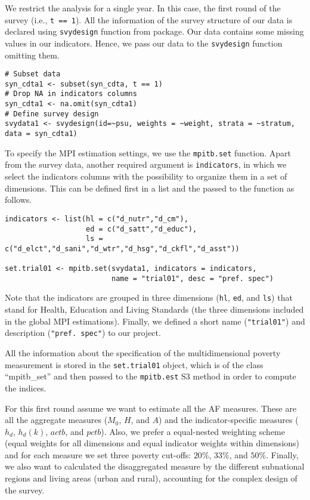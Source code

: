 We restrict the analysis for a single year. In this case, the first
round of the survey (i.e., \texttt{t\ ==\ 1}). All the information of the survey
structure of our data is declared using \texttt{svydesign} function from
 package. Our data contains some missing values in our
indicators. Hence, we pass our data to the \texttt{svydesign} function omitting
them.

\begin{verbatim}
# Subset data
syn_cdta1 <- subset(syn_cdta, t == 1)
# Drop NA in indicators columns
syn_cdta1 <- na.omit(syn_cdta1)
# Define survey design
svydata1 <- svydesign(id=~psu, weights = ~weight, strata = ~stratum, data = syn_cdta1)
\end{verbatim}

To specify the MPI estimation settings, we use the \texttt{mpitb.set} function.
Apart from the survey data, another required argument is \texttt{indicators},
in which we select the indicators columns with the possibility to organize them in a set of
dimensions. This can be defined first in a list and the passed to the function as
follows.

\begin{verbatim}
indicators <- list(hl = c("d_nutr","d_cm"),
                   ed = c("d_satt","d_educ"),
                   ls = c("d_elct","d_sani","d_wtr","d_hsg","d_ckfl","d_asst"))

set.trial01 <- mpitb.set(svydata1, indicators = indicators, 
                         name = "trial01", desc = "pref. spec")
\end{verbatim}

Note that the indicators are grouped in three dimensions (\texttt{hl}, \texttt{ed}, and
\texttt{ls}) that stand for Health, Education and Living Standards (the three
dimensions included in the global MPI estimations). Finally, we defined a
short name (\texttt{"trial01"}) and description (\texttt{"pref.\ spec"}) to our
project.

All the information about the specification of the multidimensional
poverty measurement is stored in the \texttt{set.trial01} object, which is of the class
``mpitb\_set'' and then passed to the \texttt{mpitb.est} S3 method in order to
compute the indices.

For this first round assume we want to estimate all the AF measures.
These are all the aggregate measures (\(M_0\), \(H\), and \(A\)) and the
indicator-specific measures (\(h_d\), \(h_d(k)\), \(actb\), and \(pctb\)). Also,
we prefer a equal-nested weighting scheme (equal weights for all
dimensions and equal indicator weights within dimensions) and for each
measure we set three poverty cut-offs: \(20\%\), \(33\%\), and \(50\%\).
Finally, we also want to calculated the disaggregated measure by the
different subnational regions and living areas (urban and rural),
accounting for the complex design of the survey.

